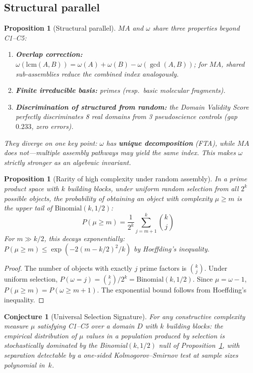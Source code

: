 \documentclass[11pt,a4paper]{article}
\newtheorem{proposition}[theorem]{Proposition}
\newtheorem{conjecture}[theorem]{Conjecture}
\begin{document}
\subsection{Structural parallel}

\begin{proposition}[Structural parallel]
\label{prop:parallel}
$MA$ and $\omega$ share three properties beyond C1--C5:
\begin{enumerate}[nosep]
\item \textbf{Overlap correction:}
  $\omega(\mathrm{lcm}(A,B))=\omega(A)+\omega(B)-\omega(\gcd(A,B))$;
  for $MA$, shared sub-assemblies reduce the combined index
  analogously.
\item \textbf{Finite irreducible basis:} primes (resp.\ basic
  molecular fragments).
\item \textbf{Discrimination of structured from random:} the Domain
  Validity Score~\citep{p4} perfectly discriminates 8 real domains
  from 3 pseudoscience controls (gap $0.233$, zero errors).
\end{enumerate}
They diverge on one key point: $\omega$ has \textbf{unique
decomposition} (FTA), while $MA$ does not---multiple assembly
pathways may yield the same index. This makes $\omega$ strictly
stronger as an algebraic invariant.
\end{proposition}

\begin{proposition}[Rarity of high complexity under random assembly]
\label{prop:rarity}
In a prime product space with $k$ building blocks, under uniform
random selection from all $2^k$ possible objects, the probability
of obtaining an object with complexity $\mu\geq m$ is the upper
tail of $\mathrm{Binomial}(k,1/2)$:
\begin{equation}
P(\mu\geq m) = \frac{1}{2^k}\sum_{j=m+1}^{k}\binom{k}{j}
\end{equation}
For $m\gg k/2$, this decays exponentially:
$P(\mu\geq m)\leq\exp(-2(m-k/2)^2/k)$ by Hoeffding's inequality.
\end{proposition}

\begin{proof}
The number of objects with exactly $j$ prime factors is
$\binom{k}{j}$. Under uniform selection,
$P(\omega=j)=\binom{k}{j}/2^k = \mathrm{Binomial}(k,1/2)$.
Since $\mu=\omega-1$, $P(\mu\geq m)=P(\omega\geq m+1)$.
The exponential bound follows from Hoeffding's inequality.
\end{proof}

\begin{conjecture}[Universal Selection Signature]
\label{conj:uss}
For any constructive complexity measure $\mu$ satisfying C1--C5
over a domain $D$ with $k$ building blocks: the empirical
distribution of $\mu$ values in a population produced by
selection is stochastically dominated by the Binomial$(k,1/2)$
null of Proposition~\ref{prop:rarity}, with separation detectable
by a one-sided Kolmogorov--Smirnov test at sample sizes
polynomial in~$k$.
\end{conjecture}
\end{document}
